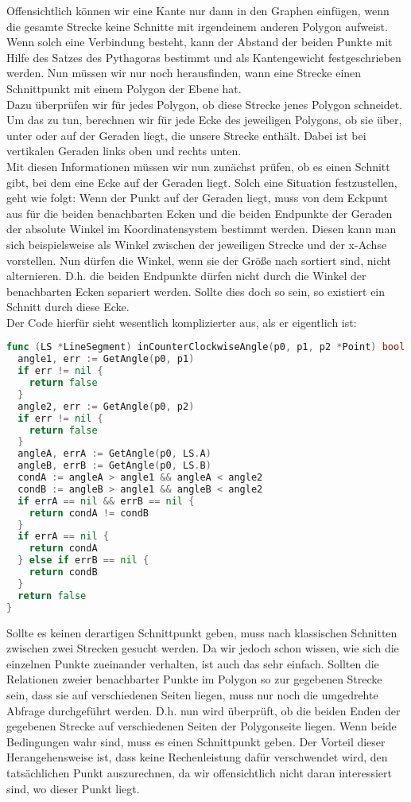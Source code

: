 \documentclass[a4paper,10pt,ngerman]{scrartcl}
\begin{document}
Offensichtlich können wir eine Kante nur dann in den Graphen einfügen, wenn die gesamte Strecke keine Schnitte mit irgendeinem anderen Polygon aufweist. Wenn solch eine Verbindung besteht, kann der Abstand der beiden Punkte mit Hilfe des Satzes des Pythagoras bestimmt und als Kantengewicht festgeschrieben werden. Nun müssen wir nur noch herausfinden, wann eine Strecke einen Schnittpunkt mit einem Polygon der Ebene hat.\\
Dazu überprüfen wir für jedes Polygon, ob diese Strecke jenes Polygon schneidet. Um das zu tun, berechnen wir für jede Ecke des jeweiligen Polygons, ob sie über, unter oder auf der Geraden liegt, die unsere Strecke enthält. Dabei ist bei vertikalen Geraden links oben und rechts unten.\\
Mit diesen Informationen müssen wir nun zunächst prüfen, ob es einen Schnitt gibt, bei dem eine Ecke auf der Geraden liegt. Solch eine Situation festzustellen, geht wie folgt: Wenn der Punkt auf der Geraden liegt, muss von dem Eckpunt aus für die beiden benachbarten Ecken und die beiden Endpunkte der Geraden der absolute Winkel im Koordinatensystem bestimmt werden. Diesen kann man sich beispielsweise als Winkel zwischen der jeweiligen Strecke und der x-Achse vorstellen. Nun dürfen die Winkel, wenn sie der Grö\ss e nach sortiert sind, nicht alternieren. D.h. die beiden Endpunkte dürfen nicht durch die Winkel der benachbarten Ecken separiert werden. Sollte dies doch so sein, so existiert ein Schnitt durch diese Ecke.\\
Der Code hierfür sieht wesentlich komplizierter aus, als er eigentlich ist:
\begin{lstlisting}[language=go]
func (LS *LineSegment) inCounterClockwiseAngle(p0, p1, p2 *Point) bool {
  angle1, err := GetAngle(p0, p1)
  if err != nil {
    return false
  }
  angle2, err := GetAngle(p0, p2)
  if err != nil {
    return false
  }
  angleA, errA := GetAngle(p0, LS.A)
  angleB, errB := GetAngle(p0, LS.B)
  condA := angleA > angle1 && angleA < angle2
  condB := angleB > angle1 && angleB < angle2
  if errA == nil && errB == nil {
    return condA != condB
  }
  if errA == nil {
    return condA
  } else if errB == nil {
    return condB
  }
  return false
}
\end{lstlisting}
Sollte es keinen derartigen Schnittpunkt geben, muss nach klassischen Schnitten zwischen zwei Strecken gesucht werden. Da wir jedoch schon wissen, wie sich die einzelnen Punkte zueinander verhalten, ist auch das sehr einfach. Sollten die Relationen zweier benachbarter Punkte im Polygon so zur gegebenen Strecke sein, dass sie auf verschiedenen Seiten liegen, muss nur noch die umgedrehte Abfrage durchgeführt werden. D.h. nun wird überprüft, ob die beiden Enden der gegebenen Strecke auf verschiedenen Seiten der Polygonseite liegen. Wenn beide Bedingungen wahr sind, muss es einen Schnittpunkt geben. Der Vorteil dieser Herangehensweise ist, dass keine Rechenleistung dafür verschwendet wird, den tatsächlichen Punkt auszurechnen, da wir offensichtlich nicht daran interessiert sind, wo dieser Punkt liegt.\\
\end{document}
